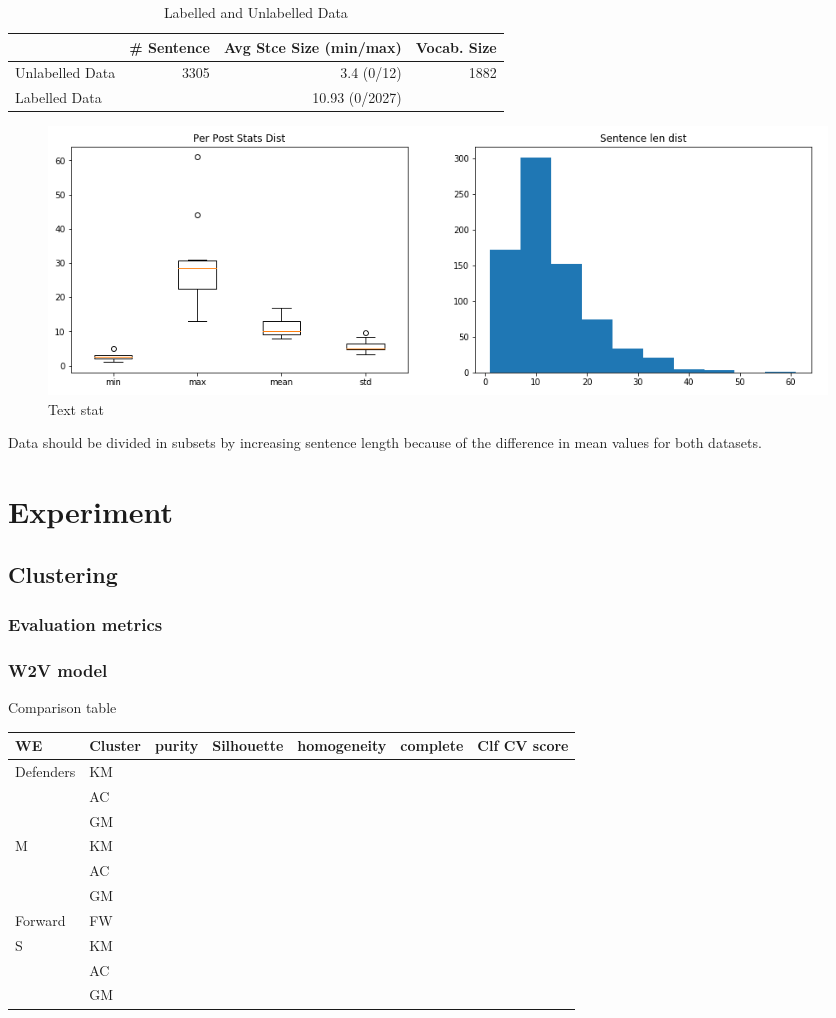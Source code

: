 \documentclass[11pt]{article}
\begin{document}
\begin{table}
\begin{tabular}{ |l|rrr| }
  \hline
   & \# Sentence & Avg Stce Size (min/max) & Vocab. Size\\\hline
  Unlabelled Data & 3305 & 3.4 (0/12) & 1882 \\
  Labelled Data & & 10.93 (0/2027) & \\\hline
\end{tabular}
\caption{Labelled and Unlabelled Data}
\label{tab:datastats}
\end{table}
 \begin{figure}[h]
 	\centering
 	\includegraphics[scale=0.5]{report3.png}
	\caption{Text stat}\label{visina8}
 \end{figure}

Data should be divided in subsets by increasing sentence length because of the difference in mean values for both datasets.



\section{Experiment}

\subsection{Clustering}
\subsubsection{Evaluation metrics}
\subsubsection{W2V model}

Comparison table

\begin{tabular}{ |p{2cm}|p{1cm}|c|c|c|c|p{1cm}| }
\hline
WE & Cluster & purity & Silhouette & homogeneity & complete & Clf CV score \\ \hline
\multirow{3}{*}{Defenders} & KM & & & & &\\
 & AC & & & & &\\
 & GM & & & & &\\ \hline
\multirow{3}{*}{M} & KM & & & & &\\
 & AC & & & & &\\
 & GM & & & & &\\ \hline
Forward & FW & & & & &\\ \hline
\multirow{3}{*}{S} & KM & & & & &\\
 & AC & & & & &\\
 & GM & & & & &\\
\hline
\end{tabular}
\end{document}
